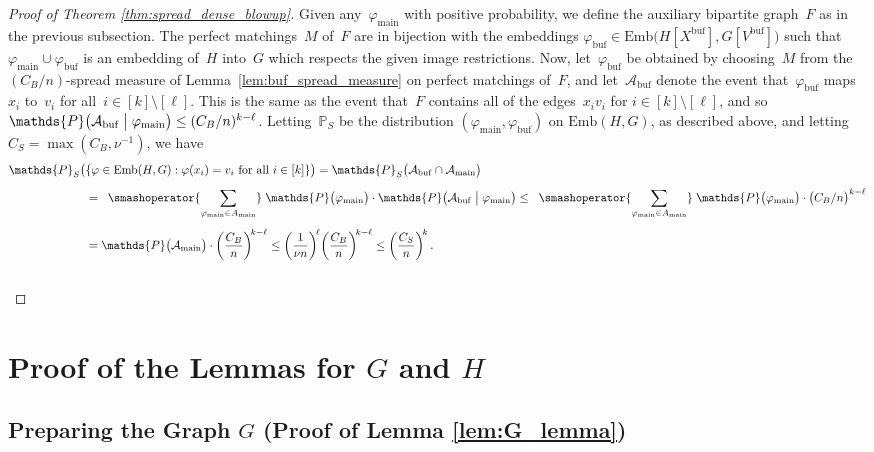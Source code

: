 \documentclass[final]{article}
\theoremstyle{definition}
\newcommand{\main}{\mathrm{main}}
\newcommand{\buf}{\mathrm{buf}}
\newcommand{\Emb}{\mathrm{Emb}}
\begin{document}
\begin{proof}[Proof of Theorem \ref{thm:spread_dense_blowup}]
    Given any~$\varphi_{\main}$ with positive probability, we define the auxiliary bipartite graph~$F$ as in the previous subsection. The perfect matchings~$M$ of~$F$ are in bijection with the embeddings $\varphi_{\buf} \in \Emb\bigl(H[X^{\buf}], G[V^{\buf}]\bigr)$ such that $\varphi_{\main}\cup\varphi_{\buf}$ is an embedding of~$H$ into~$G$ which respects the given image restrictions. Now, let~$\varphi_{\buf}$ be obtained by choosing~$M$ from the~$(C_B/n)$-spread measure of Lemma~\ref{lem:buf_spread_measure} on perfect matchings of~$F$, and let~$\mathcal{A}_{\buf}$ denote the event that~$\varphi_{\buf}$ maps~$x_i$ to~$v_i$ for all~$i \in [k]\setminus[\ell]$. This is the same as the event that~$F$ contains all of the edges~$x_iv_i$ for $i\in[k]\setminus[\ell]$, and so $\mathds{P}\bigl(\mathcal{A}_{\buf}\bigm|\varphi_{\main}\bigr) \leq (C_B/n)^{k-\ell}$. Letting~$\mathds{P}_S$ be the distribution $(\varphi_{\main},\varphi_{\buf})$ on $\Emb(H,G)$, as described above, and letting $C_S=\max(C_B,\nu^{-1})$, we have
    \begin{align*}
        \mathds{P}_S\bigl(&\{\varphi \in \Emb(H,G): \varphi(x_i) = v_i \text{ for all } i \in [k]\}\bigr) = \mathds{P}_S\bigl(\mathcal{A}_{\buf} \cap \mathcal{A}_{\main}\bigr)\\[0.5em]
        &= \;\; \smashoperator{\sum_{\varphi_{\main}\in A_\main}}\;\mathds{P}\bigl(\varphi_{\main}\bigr)\cdot \mathds{P}\bigl(\mathcal{A}_{\buf} \bigm| \varphi_{\main}\bigr) \leq \;\; \smashoperator{\sum_{\varphi_{\main}\in A_\main}}\;\mathds{P}\bigl(\varphi_{\main}\bigr)\cdot\bigl(C_B/n\bigr)^{k-\ell}\\[0.5em]
        &=\mathds{P}\bigl(\mathcal{A}_\main\bigr)\cdot \biggl(\frac{C_B}{n}\biggr)^{\!k-\ell}\le  \biggl(\frac{1}{\nu n}\biggr)^{\!\ell} \biggl(\frac{C_B}{n}\biggr)^{\!k-\ell} \leq \biggl(\frac{C_S}{n}\biggr)^{\!k}\,. \\ & \qedhere
    \end{align*} 
\end{proof}


\section{Proof of the Lemmas for \texorpdfstring{$G$}{G} and \texorpdfstring{$H$}{H}}
\label{sec:lem_GH}

\subsection{Preparing the Graph \texorpdfstring{$G$}{G} (Proof of Lemma \ref{lem:G_lemma})}
\label{sec:robust_G_lemma}  
\end{document}
